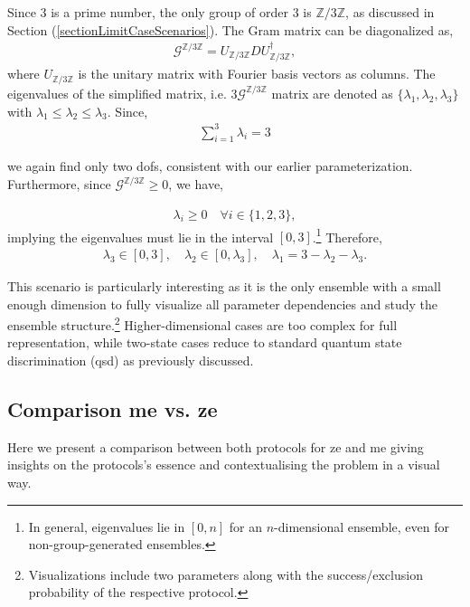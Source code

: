 \documentclass[12pt,letterpaper]{article}
\begin{document}
Since 3 is a prime number, the only group of order 3 is $\mathbb{Z}/3\mathbb{Z}$, as discussed in Section (\ref{sectionLimitCaseScenarios}). The Gram matrix can be diagonalized as,
\begin{align*}
	\mathcal{G}^{\mathbb{Z}/3\mathbb{Z}} = U_{\mathbb{Z}/3\mathbb{Z}} D U_{\mathbb{Z}/3\mathbb{Z}}^\dagger,
\end{align*}
where $U_{\mathbb{Z}/3\mathbb{Z}}$ is the unitary matrix with Fourier basis vectors as columns. The eigenvalues of the simplified matrix, i.e. $3\mathcal{G}^{\mathbb{Z}/3\mathbb{Z}}$ matrix are denoted as $\{\lambda_1,\lambda_2,\lambda_3\}$ with $\lambda_1 \leq \lambda_2 \leq \lambda_3$. Since,
\begin{align*}
	\sum_{i=1}^3 \lambda_i = 3
\end{align*}

we again find only two \glspl{dof}, consistent with our earlier parameterization. Furthermore, since $\mathcal{G}^{\mathbb{Z}/3\mathbb{Z}} \geq 0$, we have,

\begin{align*}
	\lambda_i \geq 0 \quad \forall i \in \{1,2,3\},
\end{align*}
implying the eigenvalues must lie in the interval $[0,3]$.\footnote{In general, eigenvalues lie in $[0,n]$ for an $n$-dimensional ensemble, even for non-group-generated ensembles.} Therefore,
\begin{align*}
	\lambda_3 \in [0,3], \quad \lambda_2 \in [0,\lambda_3], \quad \lambda_1 = 3 - \lambda_2 - \lambda_3.
\end{align*}

This scenario is particularly interesting as it is the only ensemble with a small enough dimension to fully visualize all parameter dependencies and study the ensemble structure.\footnote{Visualizations include two parameters along with the success/exclusion probability of the respective protocol.} Higher-dimensional cases are too complex for full representation, while two-state cases reduce to standard quantum state discrimination (\gls{qsd}) as previously discussed.

\subsection{Comparison \gls{me} vs. \gls{ze}}

\hspace{20pt}Here we present a comparison between both protocols for \gls{ze} and \gls{me} giving insights on the protocols's essence and contextualising the problem in a visual way.
\end{document}
